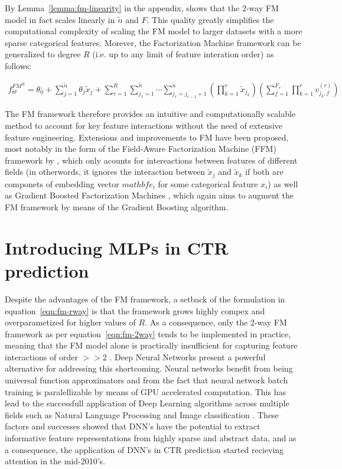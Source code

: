 \documentclass{mldsmsc}
\begin{document}
By Lemma~\ref{lemma:fm-linearity} in the appendix, \cite{RefWorks:rendle2010factorization} shows that
the 2-way FM model in fact scales linearly in $\tilde{n}$ and $F$. This quality greatly simplifies the computational complexity of scaling the FM model to larger
datasets with a more sparse categorical features. Morever, the Factorization Machine framework
can be generalized to degree $R$ (i.e. up to any limit of feature interation order) as follows:

\begin{multline}
\label{eqn:fm-rway}
f_{\Theta}^{FM^R} = \theta_0 + \sum_{j=1}^{\tilde{n}} \theta_{j} \tilde{x}_{j}
+ \sum_{r=1}^{R} \sum_{j_1=1}^{\tilde{n}} \cdots \sum_{j_r = j_{r-1} + 1}^{\tilde{n}}
\left( \prod_{k=1}^{r} \tilde{x}_{j_k} \right)
\left( \sum_{f = 1}^{F_r} \prod_{k=1}^{r} v_{j_k, f}^{(r)}\right)
\end{multline}

The FM framework therefore provides an intuitive and computationally scalable method to
account for key feature interactions without the need of extensive feature engineering. Extensions
and improvements to FM have been proposed, most notably in the form of
the Field-Aware Factorization Machine (FFM) framework by \cite{RefWorks:juan2016field-aware},
which only acounts for intereactions between features of different fields 
(in otherwords, it ignores the interaction between $\tilde{x}_j$ and $\tilde{x}_k$ if
both are componets of embedding vector $mathbf{e}_i$ for some categorical feature $x_i$)
as well as Gradient Boosted Factorization Machines \citep{RefWorks:cheng2014gradient}, 
which again aims to augment the FM framework by means of the Gradient Boosting algorithm.

\section{Introducing MLPs in CTR prediction}

Despite the advantages of the FM framework, a setback of the formulation in equation~\ref{eqn:fm-rway}
is that the framework grows highly compex and overparametized for higher values of $R$.
As a consequence, only the 2-way FM framework as per equation~\ref{eqn:fm-2way} tends to be
implemented in practice, meaning that the FM model alone is practically insufficient for capturing
feature interactions of order $>>2$ \citep{RefWorks:guo2017deepfm:}. Deep Neural Networks
present a powerful alternative for addressing this shortcoming. Neural networks benefit from
being universal function approximators \citep{RefWorks:cybenko1989approximation} and from the
fact that neural network batch training is paralellizable by means of GPU accelerated computation.
This has lead to the successfull application of Deep Learning algorithms across multiple fields
such as Natural Language Processing and Image classification 
\citep{RefWorks:he2016deep,RefWorks:krizhevsky2017imagenet,RefWorks:lecun1998gradient-based}. 
These factors and successes showed that DNN's have the potential to extract informative
feature representations from highly sparse and abstract data, and as a consequence,
the application of DNN's in CTR prediction started recieving attention in the mid-2010's.
\end{document}
